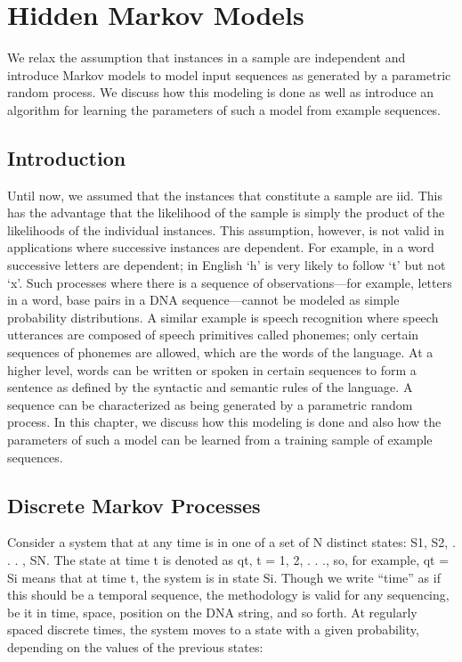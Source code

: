 \chapter{Hidden Markov Models}
\label{chap:15-hidden-markov-models}

We relax the assumption that instances in a sample are independent and introduce Markov models to model input sequences as generated by a parametric random process. We discuss how this modeling is done as well as introduce an algorithm for learning the parameters of such a model from example sequences.

\section{Introduction}

Until now, we assumed that the instances that constitute a sample are iid. This has the advantage that the likelihood of the sample is simply the product of the likelihoods of the individual instances. This assumption, however, is not valid in applications where successive instances are dependent. For example, in a word successive letters are dependent; in English ‘h’ is very likely to follow ‘t’ but not ‘x’. Such processes where there is a sequence of observations---for example, letters in a word, base pairs in a DNA sequence---cannot be modeled as simple probability distributions. A similar example is speech recognition where speech utterances are composed of speech primitives called phonemes; only certain sequences of phonemes are allowed, which are the words of the language. At a higher level, words can be written or spoken in certain sequences to form a sentence as defined by the syntactic and semantic rules of the language. A sequence can be characterized as being generated by a parametric random process. In this chapter, we discuss how this modeling is done and also how the parameters of such a model can be learned from a training sample of example sequences.

\section{Discrete Markov Processes}

Consider a system that at any time is in one of a set of N distinct states: S1, S2, . . . , SN. The state at time t is denoted as qt, t = 1, 2, . . ., so, for example, qt = Si means that at time t, the system is in state Si. Though we write “time” as if this should be a temporal sequence, the methodology is valid for any sequencing, be it in time, space, position on the DNA string, and so forth. At regularly spaced discrete times, the system moves to a state with a given probability, depending on the values of the previous states:

